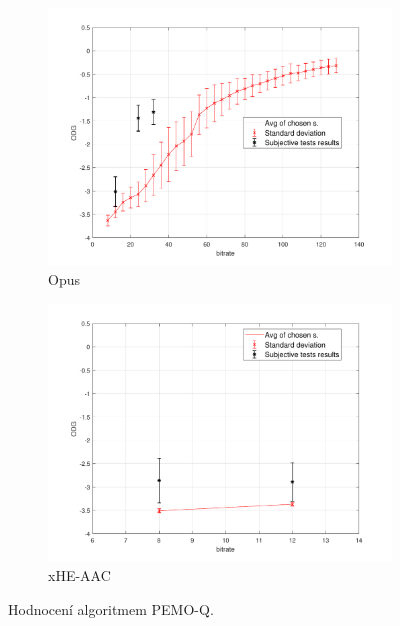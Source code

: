 \begin{figure}[h]
\begin{subfigure}{.5\textwidth}
        \includegraphics[width=1\linewidth]{pic/objective/opusPemoq.pdf}
        \caption{Opus}
        \label{app:pem:sub5}
    \end{subfigure}%
        \begin{subfigure}{.5\textwidth}
        \centering
        \includegraphics[width=1\linewidth]{pic/objective/xhePemoq.pdf}
        \caption{xHE-AAC}
        \label{app:pem:sub6}
    \end{subfigure}%
    \caption{Hodnocení algoritmem PEMO-Q.} 
\label{app:Pemoq}
\end{figure}
